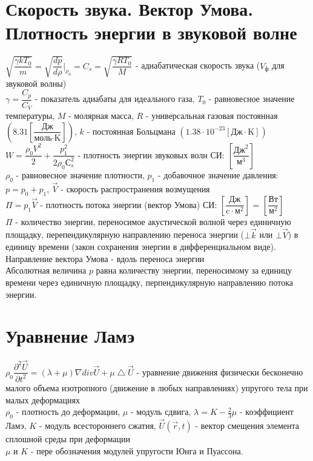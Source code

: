 \begin{multicols*}{2}
		\section{Скорость звука. Вектор Умова. Плотность энергии в звуковой волне}
		$\sqrt{\dfrac{\gamma k T_0}{m}} = \sqrt{\dfrac{dp}{d\rho}}\bigg|_{\rho_0} = C_s = \sqrt{\dfrac{\gamma R T_0}{M}}$ - адиабатическая скорость звука ($V_\text{ф}$ для звуковой волны)\\
		$\gamma = \dfrac{C_p}{C_V}$ - показатель адиабаты для идеального газа, $T_0$ - равновесное значение температуры, $M$ - молярная масса, $R$ - универсальная газовая постоянная $\left(8.31 \left[\dfrac{\text{Дж}}{\text{моль}\cdot\text{K}}\right]\right)$, $k$ - постоянная Больцмана $\left(1.38\cdot10^{-23} \left[{\text{Дж}} \cdot \text{K}\right]\right)$\\
		$W = \dfrac{\rho_0 V^2}{2} + \dfrac{p_1^2}{2\rho_0 С_s^2}$ - плотность энергии звуковых волн \quad СИ: $\left[\dfrac{\text{Дж}^2}{\text{м}^3}\right]$\\
		$\rho_0$ - равновесное значение плотности, $p_1$ - добавочное значение давления: $p = p_0 + p_1$, $\vec{V}$ - скорость распространения возмущения\\
		$\Pi = p_1 \vec{V}$ - плотность потока энергии (вектор Умова) \quad СИ: $\left[\dfrac{\text{Дж}}{\text{c}\cdot \text{м}^2}\right]$ = $\left[\dfrac{\text{Вт}}{\text{м}^2}\right]$\\
		$\Pi$ - количество энергии, переносимое акустической волной через единичную площадку, перепендикулярную направлению переноса энергии ($\bot \vec{k}$ или $\bot \vec{V}$) в единицу времени (закон сохранения энергии в дифференциальном виде). Направление вектора Умова - вдоль переноса энергии\\
		Абсолютная величина $p$ равна количеству энергии, переносимому за единицу времени через единичную площадку, перпендикулярную направлению потока энергии.

		\section{Уравнение Ламэ}
		$\rho_0 \dfrac{\partial^2 \vec{U}}{\partial t^2} = (\lambda + \mu) \nabla div \vec{U} + \mu \bigtriangleup  \vec{U}$ - уравнение движения физически бесконечно малого объема изотропного (движение в любых направлениях) упругого тела при малых деформациях\\
		$\rho_0$ - плотность до деформации, $\mu$ - модуль сдвига, $\lambda = K - \frac{2}{3}\mu$ - коэффициент Ламэ, $K$ - модуль всестороннего сжатия, $\vec{U}(\vec{r}, t)$ - вектор смещения элемента сплошной среды при деформации\\
		$\mu$ и $K$ - пере обозначения модулей упругости Юнга и Пуассона.


\end{multicols*}
